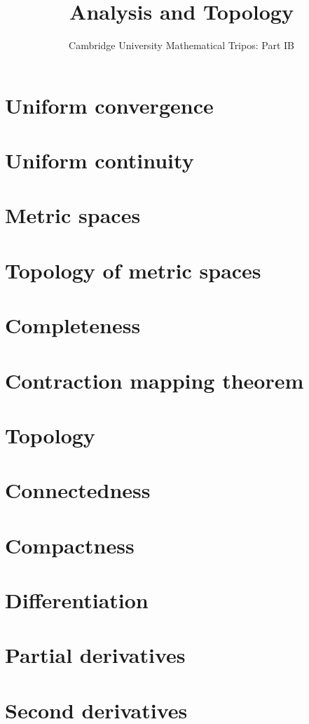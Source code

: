 \documentclass{article}
\title{Analysis and Topology}
\author{Cambridge University Mathematical Tripos: Part IB}
\begin{document}
\maketitle

\tableofcontentsnewpage{}

\section{Uniform convergence}

\section{Uniform continuity}

\section{Metric spaces}

\section{Topology of metric spaces}

\section{Completeness}

\section{Contraction mapping theorem}

\section{Topology}

\section{Connectedness}

\section{Compactness}

\section{Differentiation}

\section{Partial derivatives}

\section{Second derivatives}

\end{document}
